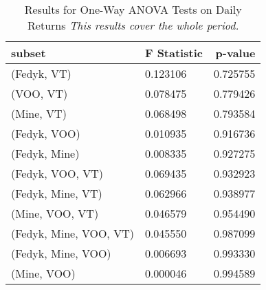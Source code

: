 \begin{appendices}
\begin{table}[ht]
\centering
\caption{Results for One-Way ANOVA Tests on Daily Returns 
\newline \footnotesize{\textit{This results cover the whole period.}}}
    \begin{tabular}{l|ll}
    \toprule
        \textbf{subset}        & \multicolumn{1}{r}{\textbf{F Statistic}} & \multicolumn{1}{r}{\textbf{p-value}} \\ \midrule
        (Fedyk, VT)            & 0.123106                                 & 0.725755                             \\
        (VOO, VT)              & 0.078475                                 & 0.779426                             \\
        (Mine, VT)             & 0.068498                                 & 0.793584                             \\
        (Fedyk, VOO)           & 0.010935                                 & 0.916736                             \\
        (Fedyk, Mine)          & 0.008335                                 & 0.927275                             \\
        (Fedyk, VOO, VT)       & 0.069435                                 & 0.932923                             \\
        (Fedyk, Mine, VT)      & 0.062966                                 & 0.938977                             \\
        (Mine, VOO, VT)        & 0.046579                                 & 0.954490                             \\
        (Fedyk, Mine, VOO, VT) & 0.045550                                 & 0.987099                             \\
        (Fedyk, Mine, VOO)     & 0.006693                                 & 0.993330                             \\
        (Mine, VOO)            & 0.000046                                 & 0.994589                            
    \end{tabular}
\label{tab:anova_all}
\end{table}



\end{appendices}
